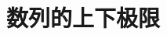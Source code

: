 \documentclass[11pt,a4paper]{ctexart}
\makeatletter
\theoremstyle{thmseries} %
\theoremstyle{exerseries}
\newtheorem{defn}{定义}[section]
\newtheorem{exer}{习题}[section]
\renewenvironment{proof}[1][\proofname]{\par
  \pushQED{\qed}%
  \normalfont \topsep6\p@\@plus6\p@\relax
  \trivlist
  \item[\hskip\labelsep
        \itshape
    #1\@addpunct{}]\ignorespaces
}{%
  \popQED\endtrivlist\@endpefalse
}
\newenvironment{pf}{\begin{proof}[\bfseries\upshape 证\quad]}{\end{proof}}
\newcommand{\bra}[1]{\mathopen{}\left(#1\right)}
\newcommand{\sbra}[1]{\mathopen{}\left[#1\right]}
\newcommand{\cbra}[1]{\mathopen{}\left\{#1\right\}}
\renewcommand{\epsilon}{\varepsilon}
\newcommand{\R}{\mathbb{R}}
\newcommand{\N}{\mathbb{N}}
\DeclareMathOperator{\ulim}{\underset{\nti}{\overline{\lim}}}
\def \nti {\mathnormal{n}\to\infty}
\makeatother
\begin{document}






\section{数列的上下极限}
\end{document}
